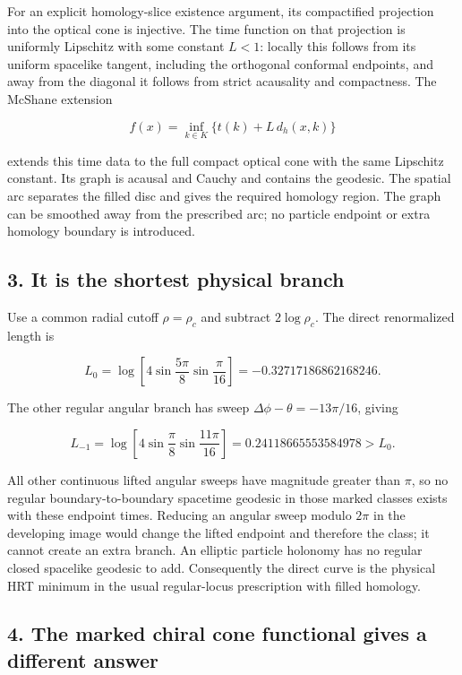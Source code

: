 \documentclass[11pt]{article}
\begin{document}
For an explicit homology-slice existence argument, its compactified
projection into the optical cone is injective. The time function on that
projection is uniformly Lipschitz with some constant \(L<1\): locally
this follows from its uniform spacelike tangent, including the
orthogonal conformal endpoints, and away from the diagonal it follows
from strict acausality and compactness. The McShane extension

\[
 f(x)=\inf_{k\in K}\{t(k)+L\,d_h(x,k)\}
\]

extends this time data to the full compact optical cone with the same
Lipschitz constant. Its graph is acausal and Cauchy and contains the
geodesic. The spatial arc separates the filled disc and gives the
required homology region. The graph can be smoothed away from the
prescribed arc; no particle endpoint or extra homology boundary is
introduced.

\subsection{3. It is the shortest physical
branch}\label{it-is-the-shortest-physical-branch}

Use a common radial cutoff \(\rho=\rho_c\) and subtract \(2\log\rho_c\).
The direct renormalized length is

\[
 L_0=\log\left[4\sin\frac{5\pi}{8}\sin\frac\pi{16}\right]
 =-0.32717186862168246.
\]

The other regular angular branch has sweep
\(\Delta\phi-\theta=-13\pi/16\), giving

\[
 L_{-1}=\log\left[4\sin\frac\pi8\sin\frac{11\pi}{16}\right]
 =0.24118665553584978>L_0.
\]

All other continuous lifted angular sweeps have magnitude greater than
\(\pi\), so no regular boundary-to-boundary spacetime geodesic in those
marked classes exists with these endpoint times. Reducing an angular
sweep modulo \(2\pi\) in the developing image would change the lifted
endpoint and therefore the class; it cannot create an extra branch. An
elliptic particle holonomy has no regular closed spacelike geodesic to
add. Consequently the direct curve is the physical HRT minimum in the
usual regular-locus prescription with filled homology.

\subsection{4. The marked chiral cone functional gives a different
answer}\label{the-marked-chiral-cone-functional-gives-a-different-answer}
\end{document}
